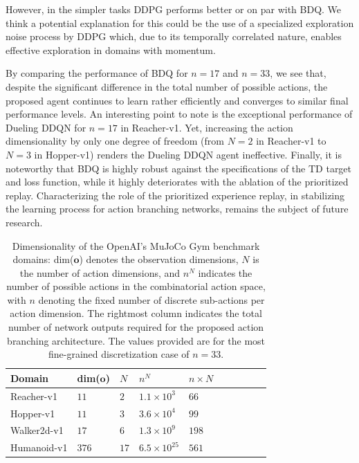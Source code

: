 \documentclass[letterpaper]{article} %
\begin{document}
However, in the simpler tasks DDPG performs better or on par with BDQ. We think a potential explanation for this could be the use of a specialized exploration noise process by DDPG which, due to its temporally correlated nature, enables effective exploration in domains with momentum.

By comparing the performance of BDQ for $n=17$ and $n=33$, we see that, despite the significant difference in the total number of possible actions, the proposed agent continues to learn rather efficiently and converges to similar final performance levels. An interesting point to note is the exceptional performance of Dueling DDQN for $n=17$ in Reacher-v1. Yet, increasing the action dimensionality by only one degree of freedom (from $N=2$ in Reacher-v1 to $N=3$ in Hopper-v1) renders the Dueling DDQN agent ineffective.
Finally, it is noteworthy that BDQ is highly robust against the specifications of the TD target and loss function, while it highly deteriorates with the ablation of the prioritized replay. Characterizing the role of the prioritized experience replay, in stabilizing the learning process for action branching networks, remains the subject of future research.

\begin{table}[t!]
  \begin{center}
  \begin{tabular}{llllllllll}
    \toprule
    Domain  & dim($\boldsymbol{o}$) & $N$ & $n^N$ & $n \times N$ \\
    \midrule
    Reacher-v1 & $11$ & $2$ & $1.1 \times 10^{3}$ & $66$ \\
    Hopper-v1  & $11$ & $3$ & $3.6 \times 10^{4}$ & $99$ \\
    Walker2d-v1 & $17$ & $6$ & $1.3 \times 10^{9}$ & $198$ \\
    Humanoid-v1 & $376$ & $17$ & $6.5 \times 10^{25}$ & $561$ \\
    \bottomrule
  \end{tabular}
  \end{center}
  \caption{Dimensionality of the OpenAI's MuJoCo Gym benchmark domains: dim($\boldsymbol{o}$) denotes the observation dimensions, $N$ is the number of action dimensions, and $n^N$ indicates the number of possible actions in the combinatorial action space, with $n$ denoting the fixed number of discrete sub-actions per action dimension. The rightmost column indicates the total number of network outputs required for the proposed action branching architecture. The values provided are for the most fine-grained discretization case of $n=33$.}
  \label{table:dim_specs_OpenAI_benchmarks}
\end{table}
\end{document}
